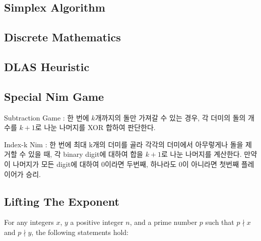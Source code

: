 \documentclass[9pt,landscape,a4paper,twocolumn]{extarticle}
\begin{document}
\subsection{Simplex Algorithm}


\subsection{Discrete Mathematics}


\subsection{DLAS Heuristic}


\subsection{Special Nim Game}



Subtraction Game : 한 번에 $k$개까지의 돌만 가져갈 수 있는 경우,
각 더미의 돌의 개수를 $k + 1$로 나눈 나머지를 XOR 합하여 판단한다.

Index-k Nim : 한 번에 최대 k개의 더미를 골라 각각의 더미에서 아무렇게나 돌을
제거할 수 있을 때, 각 binary digit에 대하여 합을 $k + 1$로 나눈 나머지를 계산한다.
만약 이 나머지가 모든 digit에 대하여 $0$이라면 두번째, 하나라도 $0$이 아니라면
첫번째 플레이어가 승리.

% 
% 

\subsection{Lifting The Exponent}
For any integers $x$, $y$ a positive integer $n$, and a prime number $p$ such that $p \nmid x$ and $p \nmid y$, the following statements hold:
\end{document}

